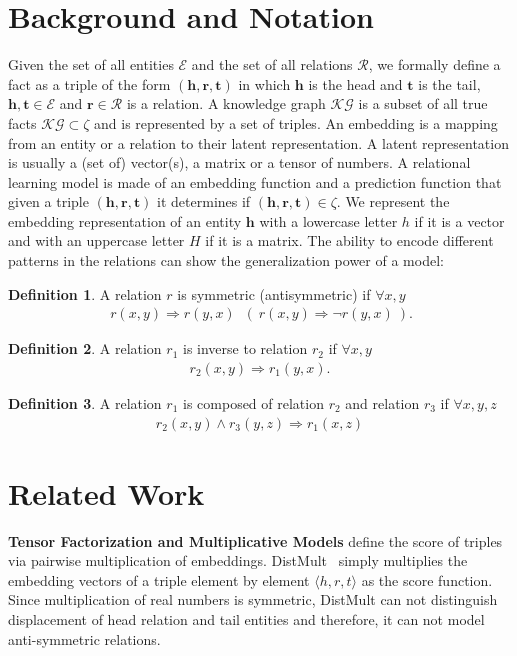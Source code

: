 \documentclass{ecai}
\begin{document}
\section{Background and Notation}
\label{sec:Background and Notation}
Given the set of all entities $\mathcal{E}$ and the set of all relations $\mathcal{R}$, we formally define a fact as a triple of the form $(\mathbf{h}, \mathbf{r}, \mathbf{t})$ in which $\mathbf{\mathbf{h}}$ is the head and $\mathbf{t}$ is the tail, $\mathbf{h,t} \in \mathcal{E}$ and $\mathbf{r} \in \mathcal{R}$ is a relation. A knowledge graph $\mathcal{KG}$ is a subset of all true facts $\mathcal{KG} \subset \zeta$ and is represented by a set of triples.
An embedding is a mapping from an entity or a relation to their latent representation. A latent representation is usually a (set of) vector(s), a matrix or a tensor of numbers. A relational learning model is made of an embedding function and a prediction function that given a triple $(\mathbf{h}, \mathbf{r}, \mathbf{t})$ it determines if $(\mathbf{h}, \mathbf{r}, \mathbf{t}) \in \zeta$. We represent the embedding representation of an entity $\mathbf{h}$ with a lowercase letter $h$ if it is a vector and with an uppercase letter $H$ if it is a matrix.  
The ability to encode different patterns in the relations can show the generalization power of a model:

\textbf{Definition 1}. A relation $r$ is symmetric (antisymmetric) if $\forall x, y$
\begin{align*}
\  r(x, y) \Rightarrow r(y, x) \;\;(\  r(x, y) \Rightarrow \neg r(y, x) \ ).
\end{align*}


\textbf{Definition 2}. A relation $r_1$ is inverse to relation $r_2$ if $\forall x, y$
\begin{align*}
r_2(x, y) \Rightarrow  r_1(y, x). 
\end{align*}


\textbf{Definition 3}. A relation $r_1$ is composed of relation $r_2$ and 
relation $r_3$ if $\forall x, y, z $
\begin{align*}
r_2(x, y) \wedge r_3(y, z)  \Rightarrow r_1(x, z)
\end{align*}


\section{Related Work}
\label{sec:Related Work}

\textbf{Tensor Factorization and Multiplicative Models} define the score of triples via pairwise multiplication of embeddings. DistMult~\cite{dismult} simply multiplies the embedding vectors of a triple element by element $\langle h,r,t \rangle$ as the score function. Since multiplication of real numbers is symmetric, DistMult can not distinguish displacement of head relation and tail entities and therefore, it can not model anti-symmetric relations.
\end{document}
